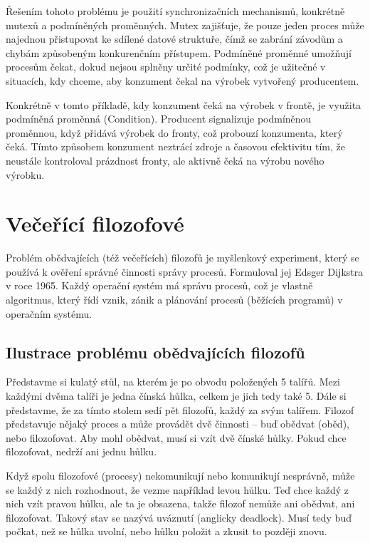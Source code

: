 \documentclass{article}
\begin{document}
Řešením tohoto problému je použití synchronizačních mechanismů, konkrétně mutexů a podmíněných proměnných. Mutex zajišťuje, že pouze jeden proces může najednou přistupovat ke sdílené datové struktuře, čímž se zabrání závodům a chybám způsobeným konkurenčním přístupem. Podmíněné proměnné umožňují procesům čekat, dokud nejsou splněny určité podmínky, což je užitečné v situacích, kdy chceme, aby konzument čekal na výrobek vytvořený producentem.

Konkrétně v tomto příkladě, kdy konzument čeká na výrobek v frontě, je využita podmíněná proměnná (Condition). Producent signalizuje podmíněnou proměnnou, když přidává výrobek do fronty, což probouzí konzumenta, který čeká. Tímto způsobem konzument neztrácí zdroje a časovou efektivitu tím, že neustále kontroloval prázdnost fronty, ale aktivně čeká na výrobu nového výrobku.
	
\newpage
	
\section*{Večeřící filozofové}

Problém obědvajících (též večeřících) filozofů je myšlenkový experiment, který se používá k ověření správné činnosti správy procesů. Formuloval jej Edsger Dijkstra v roce 1965. Každý operační systém má správu procesů, což je vlastně algoritmus, který řídí vznik, zánik a plánování procesů (běžících programů) v operačním systému.

\subsection*{Ilustrace problému obědvajících filozofů}

Představme si kulatý stůl, na kterém je po obvodu položených 5 talířů. Mezi každými dvěma talíři je jedna čínská hůlka, celkem je jich tedy také 5. Dále si představme, že za tímto stolem sedí pět filozofů, každý za svým talířem. Filozof představuje nějaký proces a může provádět dvě činnosti – buď obědvat (oběd), nebo filozofovat. Aby mohl obědvat, musí si vzít dvě čínské hůlky. Pokud chce filozofovat, nedrží ani jednu hůlku.

Když spolu filozofové (procesy) nekomunikují nebo komunikují nesprávně, může se každý z nich rozhodnout, že vezme například levou hůlku. Teď chce každý z nich vzít pravou hůlku, ale ta je obsazena, takže filozof nemůže ani obědvat, ani filozofovat. Takový stav se nazývá uváznutí (anglicky deadlock). Musí tedy buď počkat, než se hůlka uvolní, nebo hůlku položit a zkusit to později znovu.
\end{document}
